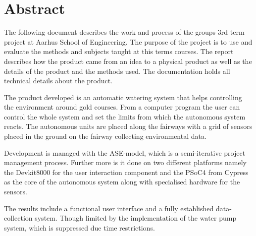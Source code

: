\chapter*{Abstract}

The following document describes the work and process of the groups 3rd term project at Aarhus School of Engineering. The purpose of the project is to use and evaluate the methods and subjects taught at this terms courses. The report describes how the product came from an idea to a physical product as well as the details of the product and the methods used. The documentation holds all technical details about the product.

The product developed is an automatic watering system that helps controlling the environment around gold courses. From a computer program the user can control the whole system and set the limits from which the autonomous system reacts. The autonomous units are placed along the fairways with a grid of sensors placed in the ground on the fairway collecting environmental data.

Development is managed with the ASE-model, which is a semi-iterative project management process. Further more is it done on two different platforms namely the Devkit8000 for the user interaction component and the PSoC4 from Cypress as the core of the autonomous system along with specialised hardware for the sensors.

The results include a functional user interface and a fully established data-collection system. Though limited by the implementation of the water pump system, which is suppressed due time restrictions.
